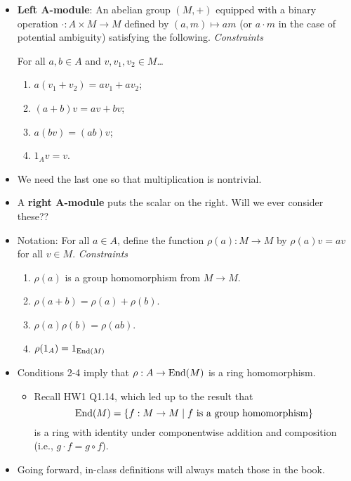 \documentclass[../notes.tex]{subfiles}
\begin{document}
\begin{itemize}
\begin{itemize}
    \end{itemize}
    \item \textbf{Left $\bm{A}$-module}: An abelian group $(M,+)$ equipped with a binary operation $\cdot:A\times M\to M$ defined by $(a,m)\mapsto am$ (or $a\cdot m$ in the case of potential ambiguity) satisfying the following. \emph{Constraints}\par
    For all $a,b\in A$ and $v,v_1,v_2\in M$\dots
    \begin{enumerate}[label={(\arabic*)}]
        \item $a(v_1+v_2)=av_1+av_2$;
        \item $(a+b)v=av+bv$;
        \item $a(bv)=(ab)v$;
        \item $1_Av=v$.
    \end{enumerate}
    \item We need the last one so that multiplication is nontrivial.
    \item A \textbf{right $\bm{A}$-module} puts the scalar on the right. Will we ever consider these??
    \item Notation: For all $a\in A$, define the function $\rho(a):M\to M$ by $\rho(a)v=av$ for all $v\in M$. \emph{Constraints}
    \begin{enumerate}[label={(\arabic*)}]
        \item $\rho(a)$ is a group homomorphism from $M\to M$.
        \item $\rho(a+b)=\rho(a)+\rho(b)$.
        \item $\rho(a)\rho(b)=\rho(ab)$.
        \item $\rho(1_A)=1_{\operatorname{End}(M)}$
    \end{enumerate}
    \item Conditions 2-4 imply that $\rho:A\to\operatorname{End}(M)$ is a ring homomorphism.
    \begin{itemize}
        \item Recall HW1 Q1.14, which led up to the result that
        \begin{equation*}
            \operatorname{End}(M) = \{f:M\to M\mid f\text{ is a group homomorphism}\}
        \end{equation*}
        is a ring with identity under componentwise addition and composition (i.e., $g\cdot f=g\circ f$).
    \end{itemize}
    \item Going forward, in-class definitions will always match those in the book.
    \begin{itemize}

\end{itemize}
\end{itemize}
\end{document}

